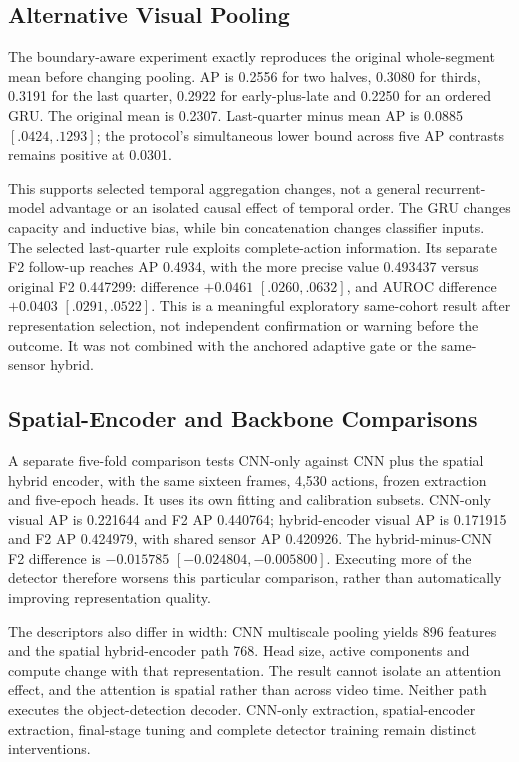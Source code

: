 \subsection{Alternative Visual Pooling}
The boundary-aware experiment exactly reproduces the original whole-segment mean before
changing pooling. AP is 0.2556 for two halves, 0.3080 for thirds, 0.3191 for the last
quarter, 0.2922 for early-plus-late and 0.2250 for an ordered GRU. The original mean is
0.2307. Last-quarter minus mean AP is 0.0885 $[.0424,.1293]$; the protocol's
simultaneous lower bound across five AP contrasts remains positive at 0.0301.

This supports selected temporal aggregation changes, not a general recurrent-model
advantage or an isolated causal effect of temporal order. The GRU changes capacity and
inductive bias, while bin concatenation changes classifier inputs. The selected
last-quarter rule exploits complete-action information. Its separate F2 follow-up
reaches AP 0.4934, with the more precise value 0.493437 versus original F2 0.447299:
difference $+0.0461$ $[.0260,.0632]$, and AUROC difference $+0.0403$ $[.0291,.0522]$.
This is a meaningful exploratory same-cohort result after representation selection, not
independent confirmation or warning before the outcome. It was not combined with the
anchored adaptive gate or the same-sensor hybrid.

\subsection{Spatial-Encoder and Backbone Comparisons}
A separate five-fold comparison tests CNN-only against CNN plus the spatial hybrid
encoder, with the same sixteen frames, 4,530 actions, frozen extraction and five-epoch
heads. It uses its own fitting and calibration subsets. CNN-only visual AP is 0.221644
and F2 AP 0.440764; hybrid-encoder visual AP is 0.171915 and F2 AP 0.424979, with shared
sensor AP 0.420926. The hybrid-minus-CNN F2 difference is $-0.015785$
$[-0.024804,-0.005800]$. Executing more of the detector therefore worsens this
particular comparison, rather than automatically improving representation
quality.

The descriptors also differ in width: CNN multiscale pooling yields 896 features and the
spatial hybrid-encoder path 768. Head size, active components and compute change with
that representation. The result cannot isolate an attention effect, and the attention is
spatial rather than across video time. Neither path executes the object-detection
decoder. CNN-only extraction, spatial-encoder extraction, final-stage tuning and
complete detector training remain distinct interventions.

